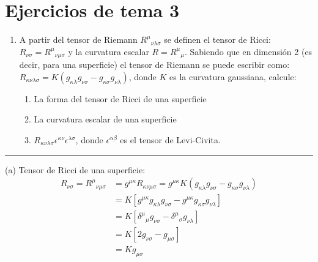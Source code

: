 
\chapter*{Ejercicios de tema 3}
\large

\begin{enumerate}
    \item[\fbox{6}]  A partir del tensor de Riemann $R^\mu {}_{\nu \lambda \sigma }$ se definen el tensor de Ricci: $R_{\nu \sigma }=R^\mu {}_{\nu \mu \sigma }$ y la curvatura escalar $R=R^{\mu}{}_\mu $. Sabiendo que en dimensión 2 (es decir, para una superficie) el tensor de Riemann se puede escribir como: $R_{\kappa \nu \lambda \sigma }=K(g_{\kappa \lambda }g_{\nu \sigma }-g_{\kappa \sigma }g_{\nu \lambda })$, donde $K$ es la curvatura gaussiana, calcule:
    \begin{enumerate}
        \item La forma del tensor de Ricci de una superficie
        \item La curvatura escalar de una superficie
        \item $R_{\kappa \nu \lambda \sigma }\epsilon ^{\kappa \nu }\epsilon^{\lambda \sigma }$, donde $\epsilon^{\alpha \beta }$ es el tensor de Levi-Civita.
    \end{enumerate}
\end{enumerate}
\noindent\rule{\textwidth}{0.5pt}

(a) Tensor de Ricci de una superficie:
\begin{equation*}
    \begin{split}
        R_{\nu \sigma}=R^\mu {}_{\nu \mu \sigma }&=g^{\mu \kappa }R_{\kappa \nu \mu \sigma }=g^{\mu \kappa }K (g_{\kappa \lambda }g_{\nu \sigma }-g_{\kappa \sigma }g_{\nu \lambda })\\
        &=K [ g^{\mu \kappa }g_{\kappa \lambda }g_{\nu \sigma }-g^{\mu \kappa }g_{\kappa \sigma }g_{\nu \lambda } ]\\
        &=K [ \delta ^\mu {}_\mu g_{\nu \sigma }-\delta ^\mu {}_\sigma g_{\nu \lambda } ]\\
        &=K[ 2g_{\nu \sigma }-g_{\mu \sigma } ]\\
        &=\boxed{Kg_{\mu \sigma }}
    \end{split}
\end{equation*}